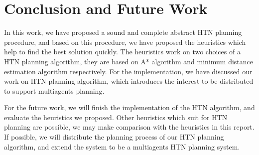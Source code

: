\chapter{Conclusion and Future Work}
\label{chapter5}
In this work, we have proposed a sound and complete abstract HTN planning procedure, and based on this procedure, we have proposed the heuristics which help to find the best solution quickly. The heuristics work on two choices of a HTN planning algorithm, they are based on A* algorithm and minimum distance estimation algorithm respectively. For the implementation, we have discussed our work on HTN planning algorithm, which introduces the interest to be distributed to support multiagents planning.

For the future work, we will finish the implementation of the HTN algorithm, and evaluate the heuristics we proposed. Other heuristics which suit for HTN planning are possible, we may make comparison with the heuristics in this report. If possible, we will distribute the planning process of our HTN planning algorithm, and extend the system to be a multiagents HTN planning system.
